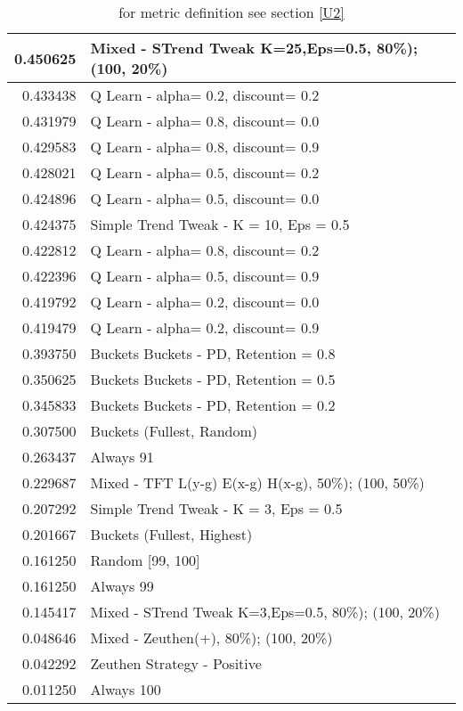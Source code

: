 \begin{table}[!hbtp]
\begin{footnotesize}
\begin{tabular}{|r|l|}
0.450625 & Mixed - {STrend Tweak K=25,Eps=0.5, 80\%); (100, 20\%)}\\ \hline
0.433438 & Q Learn - alpha= 0.2, discount= 0.2\\ \hline
0.431979 & Q Learn - alpha= 0.8, discount= 0.0\\ \hline
0.429583 & Q Learn - alpha= 0.8, discount= 0.9\\ \hline
0.428021 & Q Learn - alpha= 0.5, discount= 0.2\\ \hline
0.424896 & Q Learn - alpha= 0.5, discount= 0.0\\ \hline
0.424375 & Simple Trend Tweak - K = 10, Eps = 0.5\\ \hline
0.422812 & Q Learn - alpha= 0.8, discount= 0.2\\ \hline
0.422396 & Q Learn - alpha= 0.5, discount= 0.9\\ \hline
0.419792 & Q Learn - alpha= 0.2, discount= 0.0\\ \hline
0.419479 & Q Learn - alpha= 0.2, discount= 0.9\\ \hline
0.393750 & Buckets Buckets - PD, Retention = 0.8\\ \hline
0.350625 & Buckets Buckets - PD, Retention = 0.5\\ \hline
0.345833 & Buckets Buckets - PD, Retention = 0.2\\ \hline
0.307500 & Buckets (Fullest, Random)\\ \hline
0.263437 & Always 91\\ \hline
0.229687 & Mixed - {TFT L(y-g) E(x-g) H(x-g), 50\%); (100, 50\%)}\\ \hline
0.207292 & Simple Trend Tweak - K = 3, Eps = 0.5\\ \hline
0.201667 & Buckets (Fullest, Highest)\\ \hline
0.161250 & Random [99, 100]\\ \hline
0.161250 & Always 99\\ \hline
0.145417 & Mixed - {STrend Tweak K=3,Eps=0.5, 80\%); (100, 20\%)}\\ \hline
0.048646 & Mixed - {Zeuthen(+), 80\%); (100, 20\%)}\\ \hline
0.042292 & Zeuthen Strategy - Positive\\ \hline
0.011250 & Always 100\\ \hline
\end{tabular}
\caption{for metric definition see section \eqref{U2}}
\end{footnotesize}
\end{table}

